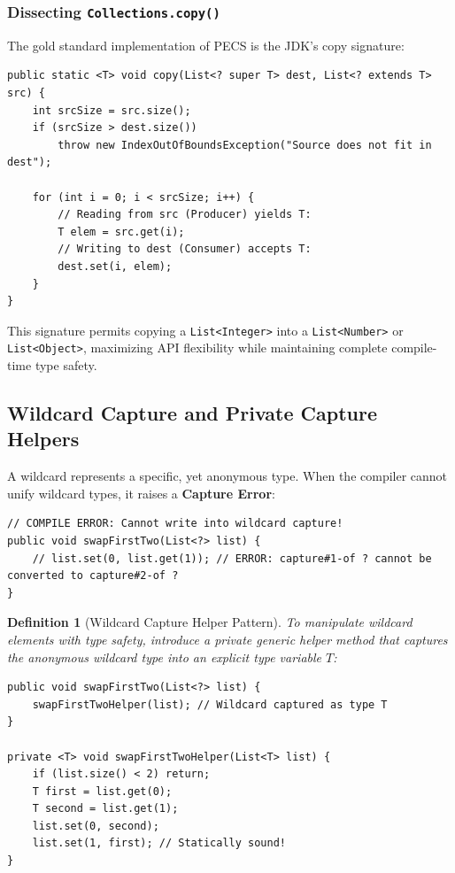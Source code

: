 \documentclass[10pt,journal,compsoc,onecolumn]{IEEEtran}
\newtheorem{definition}[theorem]{Definition}
\begin{document}
\subsubsection{Dissecting \texttt{Collections.copy()}}
The gold standard implementation of PECS is the JDK's copy signature:
\begin{lstlisting}[caption={Canonical PECS Signature in Collections.copy}]
public static <T> void copy(List<? super T> dest, List<? extends T> src) {
    int srcSize = src.size();
    if (srcSize > dest.size())
        throw new IndexOutOfBoundsException("Source does not fit in dest");

    for (int i = 0; i < srcSize; i++) {
        // Reading from src (Producer) yields T:
        T elem = src.get(i); 
        // Writing to dest (Consumer) accepts T:
        dest.set(i, elem);   
    }
}
\end{lstlisting}
This signature permits copying a \texttt{List<Integer>} into a \texttt{List<Number>} or \texttt{List<Object>}, maximizing API flexibility while maintaining complete compile-time type safety.

\subsection{Wildcard Capture and Private Capture Helpers}
A wildcard represents a specific, yet anonymous type. When the compiler cannot unify wildcard types, it raises a \textbf{Capture Error}:
\begin{lstlisting}
// COMPILE ERROR: Cannot write into wildcard capture!
public void swapFirstTwo(List<?> list) {
    // list.set(0, list.get(1)); // ERROR: capture#1-of ? cannot be converted to capture#2-of ?
}
\end{lstlisting}

\begin{definition}[Wildcard Capture Helper Pattern]
To manipulate wildcard elements with type safety, introduce a private generic helper method that captures the anonymous wildcard type into an explicit type variable $T$:
\begin{lstlisting}[caption={The Wildcard Capture Helper Solution}]
public void swapFirstTwo(List<?> list) {
    swapFirstTwoHelper(list); // Wildcard captured as type T
}

private <T> void swapFirstTwoHelper(List<T> list) {
    if (list.size() < 2) return;
    T first = list.get(0);
    T second = list.get(1);
    list.set(0, second);
    list.set(1, first); // Statically sound!
}
\end{lstlisting}
\end{definition}
\end{document}
